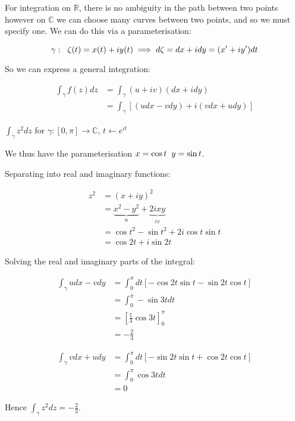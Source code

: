 \documentclass{physics_notes}
\begin{document}
For integration on $\mathbb{R}$, there is no ambiguity in the path between two points however on $\mathbb{C}$ we can choose many curves between two points, and so we must specify one. We can do this via a parameterisation:

\begin{equation*}
\gamma : \hspace{.2cm} \zeta (t) = x(t) + i y(t) \implies d\zeta = dx + i dy = (x' + i y')dt
\end{equation*}

So we can express a general integration:

\begin{align*}
\int_{\gamma} f(z) dz &= \int_{\gamma} (u + iv)(dx + idy) \\
&= \int_\gamma [(udx - vdy) + i(vdx + udy)]
\end{align*}

\begin{example}{$\int_\gamma z^2 dz$ for $\gamma: [0,\pi] \rightarrow \mathbb{C}$, $t \leftarrow e^{it}$}

We thus have the parameterisation $x = \cos{t} \hspace{.2cm} y = \sin{t}$.

Separating into real and imaginary functions:

\begin{align*}
z^2 &= (x + iy)^2 \\
&= \underbrace{x^2 - y^2}_{u} + \underbrace{2ixy}_{iv} \\
&= \cos{t}^2 - \sin{t}^2 + 2i\cos{t}\sin{t} \\
&= \cos{2t} + i\sin{2t}
\end{align*}

Solving the real and imaginary parts of the integral:

\begin{align*}
\int_\gamma udx - vdy &= \int_{0}^{\pi} dt \left[-\cos{2t}\sin{t} - \sin{2t}\cos{t}\right] \\
&= \int_{0}^{\pi}  - \sin{3t} dt \\
&= \left[\frac{1}{3}\cos{3t}\right]^{\pi}_{0} \\
&= -\frac{2}{3}
\end{align*}

\begin{align*}
\int_\gamma vdx + udy &= \int_{0}^{\pi} dt \left[-\sin{2t}\sin{t} + \cos{2t}\cos{t}\right] \\
&= \int_{0}^{\pi} \cos{3t} dt \\
&= 0
\end{align*}

Hence $\int_\gamma z^2 dz = -\frac{2}{3}$.
\end{example}
\end{document}
